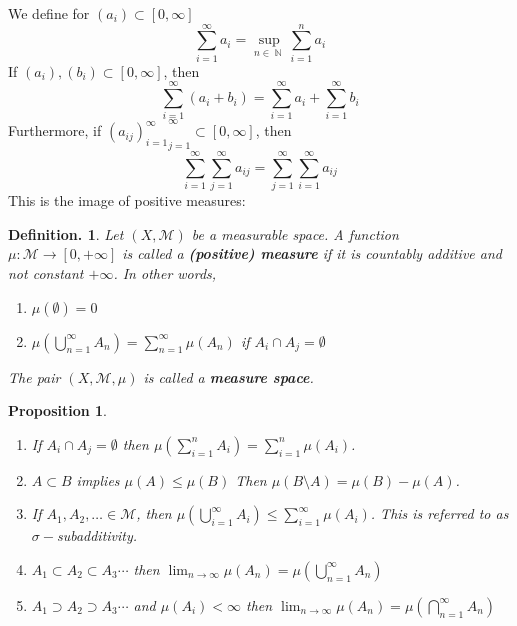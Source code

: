 \documentclass[12pt, a4paper]{memoir}
\DeclareMathOperator{\N}{{\mathbb{N}}}
\newtheorem{proposition}[theorem]{Proposition}
\theoremstyle{nonumberplain}
\newtheorem{definition}{Definition.}
\begin{document}
We define for $(a_i)\subset[0,\infty]$
\[\sum\limits_{i=1}^\infty a_i=\sup_{n\in\N}\sum\limits_{i=1}^n a_i\]
If $(a_i),(b_i)\subset[0,\infty]$, then
\[\sum\limits_{i=1}^\infty(a_i+b_i)=\sum\limits_{i=1}^\infty a_i+\sum\limits_{i=1}^\infty b_i\]
Furthermore, if ${(a_{ij})_{i=1}^\infty}_{j=1}^\infty\subset[0,\infty]$, then
\[\sum\limits_{i=1}^\infty\sum\limits_{j=1}^\infty a_{ij}=\sum\limits_{j=1}^\infty\sum\limits_{i=1}^\infty a_{ij}\]
This is the image of positive measures:
\begin{definition}
    Let $(X,\mathcal{M})$ be a measurable space.
    A function $\mu:\mathcal{M}\to[0,+\infty]$ is called a \textbf{(positive) measure} if it is countably additive and not constant $+\infty$.
    In other words,
    \begin{enumerate}[nolistsep]
        \item $\mu(\emptyset)=0$
        \item $\mu\left(\bigcup\limits_{n=1}^\infty A_n\right)=\sum\limits_{n=1}^\infty \mu(A_n)$ if $A_i\cap A_j=\emptyset$
    \end{enumerate}
    The pair $(X,\mathcal{M},\mu)$ is called a \textbf{measure space}.
\end{definition}
\begin{proposition}
    \begin{enumerate}[nolistsep]
        \item If $A_i\cap A_j=\emptyset$ then $\mu\left(\sum_{i=1}^n A_i\right)=\sum_{i=1}^n\mu(A_i)$.
        \item $A\subset B$ implies $\mu(A)\leq\mu(B)$
            Then $\mu(B\setminus A)=\mu(B)-\mu(A)$.
        \item If $A_1,A_2,\ldots\in\mathcal{M}$, then $\mu\left(\bigcup_{i=1}^\infty A_i\right)\leq\sum_{i=1}^\infty \mu(A_i)$.
            This is referred to as $\sigma-$subadditivity.
        \item $A_1\subset A_2\subset A_3\cdots$ then $\lim_{n\to\infty}\mu(A_n)=\mu\left(\bigcup_{n=1}^\infty A_n\right)$
        \item $A_1\supset A_2\supset A_3\cdots$ and $\mu(A_i)<\infty$ then $\lim_{n\to\infty}\mu(A_n)=\mu\left(\bigcap_{n=1}^\infty A_n\right)$
    \end{enumerate}
\end{proposition}
\end{document}
